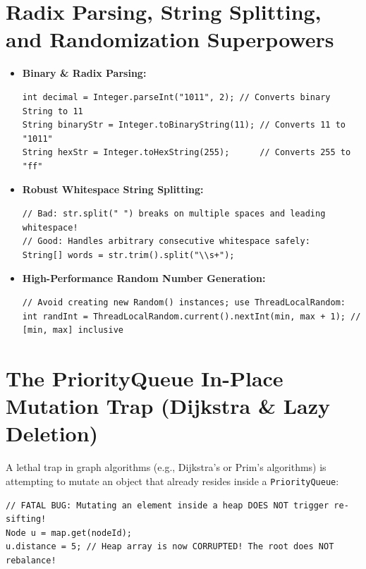 \documentclass[10pt,journal,compsoc,onecolumn]{IEEEtran}
\begin{document}
\section{Radix Parsing, String Splitting, and Randomization Superpowers}
\label{sec:radix_random}

\begin{itemize}
    \item \textbf{Binary \& Radix Parsing:}
\begin{verbatim}
int decimal = Integer.parseInt("1011", 2); // Converts binary String to 11
String binaryStr = Integer.toBinaryString(11); // Converts 11 to "1011"
String hexStr = Integer.toHexString(255);      // Converts 255 to "ff"
\end{verbatim}
    \item \textbf{Robust Whitespace String Splitting:}
\begin{verbatim}
// Bad: str.split(" ") breaks on multiple spaces and leading whitespace!
// Good: Handles arbitrary consecutive whitespace safely:
String[] words = str.trim().split("\\s+");
\end{verbatim}
    \item \textbf{High-Performance Random Number Generation:}
\begin{verbatim}
// Avoid creating new Random() instances; use ThreadLocalRandom:
int randInt = ThreadLocalRandom.current().nextInt(min, max + 1); // [min, max] inclusive
\end{verbatim}
\end{itemize}

\section{The PriorityQueue In-Place Mutation Trap (Dijkstra \& Lazy Deletion)}
\label{sec:pq_mutation}

A lethal trap in graph algorithms (e.g., Dijkstra's or Prim's algorithms) is attempting to mutate an object that already resides inside a \texttt{PriorityQueue}:

\begin{verbatim}
// FATAL BUG: Mutating an element inside a heap DOES NOT trigger re-sifting!
Node u = map.get(nodeId);
u.distance = 5; // Heap array is now CORRUPTED! The root does NOT rebalance!
\end{verbatim}
\end{document}
